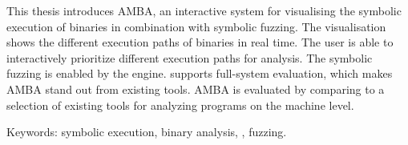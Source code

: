 This thesis introduces AMBA, an interactive system for visualising the symbolic execution of binaries in combination with symbolic fuzzing.
The visualisation shows the different execution paths of binaries in real time.
The user is able to interactively prioritize different execution paths for analysis.
The symbolic fuzzing is enabled by the \stoe{} engine.
\stoe{} supports full-system evaluation, which makes AMBA stand out from existing tools.
AMBA is evaluated by comparing to a selection of existing tools for analyzing programs on the machine level.

Keywords: symbolic execution, binary analysis, \stoe{}, fuzzing.
